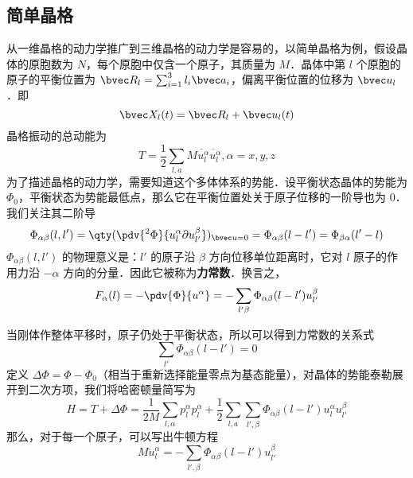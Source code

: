 
\subsection{简单晶格}
从一维晶格的动力学推广到三维晶格的动力学是容易的，以简单晶格为例，假设晶体的原胞数为 $N$，每个原胞中仅含一个原子，其质量为 $M$．晶体中第 $l$ 个原胞的原子的平衡位置为 $\bvec R_l=\sum_{i=1}^3 l_i\bvec a_i$，偏离平衡位置的位移为 $\bvec u_l$．即
\begin{equation}
\bvec X_l(t)=\bvec R_l+\bvec u_l(t)
\end{equation}
晶格振动的总动能为
\begin{equation}
T=\frac{1}{2}\sum_{l,a} M \dot{u_l^\alpha}\dot{u_l^\alpha},\alpha=x,y,z
\end{equation}
为了描述晶格的动力学，需要知道这个多体体系的势能．设平衡状态晶体的势能为 $\Phi_0$，平衡状态为势能最低点，那么它在平衡位置处关于原子位移的一阶导也为 $0$．我们关注其二阶导
\begin{equation}
\Phi_{\alpha\beta}(l,l')=\qty(\pdv{^2\Phi}{u_l^\alpha\partial u_{l'}^\beta})_{\bvec u=0}=\Phi_{\alpha\beta}(l-l')=\Phi_{\beta\alpha}(l'-l)
\end{equation}
$\Phi_{\alpha\beta}(l,l')$ 的物理意义是：$l'$ 的原子沿 $\beta$ 方向位移单位距离时，它对 $l$ 原子的作用力沿 $-\alpha$ 方向的分量．因此它被称为\textbf{力常数}．换言之，
\begin{equation}
F_\alpha(l)=-\pdv{\Phi}{u^\alpha}=-\sum_{l'\beta}\Phi_{\alpha\beta}(l-l')u_{l'}^\beta
\end{equation}

当刚体作整体平移时，原子仍处于平衡状态，所以可以得到力常数的关系式
\begin{equation}
\sum_{l'}\Phi_{\alpha\beta}(l-l')=0
\end{equation}
定义 $\Delta \Phi=\Phi-\Phi_0$（相当于重新选择能量零点为基态能量），对晶体的势能泰勒展开到二次方项，我们将哈密顿量简写为
\begin{equation}
H=T+\Delta \Phi=\frac{1}{2M}\sum_{l,\alpha}p_l^\alpha p_l^\alpha + \frac{1}{2}\sum_{l,a}\sum_{l',\beta}\Phi_{\alpha\beta}(l-l')u_l^\alpha u_{l'}^\beta
\end{equation}
那么，对于每一个原子，可以写出牛顿方程
\begin{equation}
M \ddot{u}_l^\alpha = -\sum_{l',\beta}\Phi_{\alpha\beta}(l-l')u_{l'}^\beta
\end{equation}
